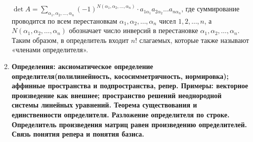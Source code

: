 \documentclass[12pt, oneside]{book}
\theoremstyle{definition}
\begin{document}
\begin{enumerate}
$\det A=\sum _{\alpha _{1},\alpha _{2},\ldots ,\alpha _{n}}(-1)^{N(\alpha _{1},\alpha _{2},\ldots ,\alpha _{n})}\cdot a_{1\alpha _{1}}a_{2\alpha _{2}}\dots a_{n\alpha _{n}}$, где суммирование проводится по всем перестановкам $ \alpha _{1},\alpha _{2},\ldots ,\alpha _{n}$ чисел  $1,2,\dots ,n$, а  $N(\alpha _{1},\alpha _{2},\ldots ,\alpha _{n})  $ обозначает число инверсий в перестановке  $\alpha _{1},\alpha _{2},\ldots ,\alpha _{n}$.
Таким образом, в определитель входит  $n!$ слагаемых, которые также называют «членами определителя».



\item \textbf{Определения: аксиоматическое определение определителя(полилинейность, кососимметричность, нормировка); аффинные пространства и подпространства, репер. Примеры: векторное произведение как внешнее; пространство решений неоднородной системы линейных уравнений. Теорема существования и единственности определителя. Разложение определителя по строке. Определитель произведения матриц равен произведению определителей. Связь понятия репера и понятия базиса.}\\


\end{enumerate}
\end{document}
